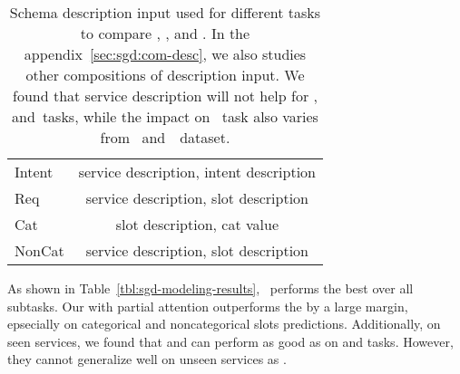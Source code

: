 \begin{table}[!t]
\begin{center}{\small
\setlength{\tabcolsep}{3pt}
\begin{tabular}{l|c}
  \toprule
\hline
Intent & service description, intent description \\
Req    & service description, slot description   \\
Cat    & slot description, cat value             \\
NonCat & service description, slot description   \\
\hline
  \bottomrule
\end{tabular}}
\end{center}
\caption{\label{tbl:sgd:schema-seq} Schema description input used for
  different tasks to compare \DE, \CE, and \FE. In the
  appendix~\ref{sec:sgd:com-desc}, we also studies other compositions of
description input. We found that service description will not help for
\IC, \RSI and~\CSL tasks, while the impact on \NSL~task also varies
from \sgdst~and~\multiwoz~dataset.}
\end{table}


 As shown in Table~\ref{tbl:sgd-modeling-results},
\CE~performs the best over all subtasks. Our \FE with partial
attention outperforms the \DE by a large margin, epsecially on
categorical and noncategorical slots predictions. Additionally, on
seen services, we found that \DE and \FE can perform as good as \CE on
\IC and \RSI tasks. However, they cannot generalize well on unseen
services as \CE. %

